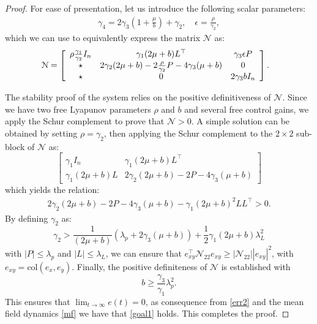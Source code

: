 \documentclass[journal,twoside]{IEEEtran}
\newcommand{\col}{ \mbox{col} }
\def\col{\mbox{col}}
\begin{document}
\begin{proof}
For ease of presentation, let us introduce the following scalar parameters: 
\begin{align}
\gamma_4=2 \gamma_3\left(1 +\frac{\mu}{b} \right) +\gamma_2, \quad \epsilon = \frac{\rho}{\gamma_2},
\end{align}
which we can use to equivalently express the matrix ${\mathcal N}$ as: 
{\small
\begin{align}
\hspace{-.3cm}
{\mathcal N}=  \left[ \begin{array}{ccc}  \rho \frac{\gamma_1}{\gamma_2} I_n &    \gamma_1 (2 \mu +b) L^\top  & \gamma_3 \epsilon P \\ \star  & 2\gamma_2 (2 \mu +b) -2\frac{\rho}{\gamma_2} P- 4\gamma_3 (\mu+b) & 0 \\
\star &   0 & 2 \gamma_3 b I_n
\end{array} \right]. 
\nonumber
\end{align}
}

The stability proof of the system relies on the positive definitiveness of ${\mathcal N}$. Since we have two free Lyapunov parameters  $\rho$ and $b$ and several free control gains,  we apply the Schur complement to prove  that ${\mathcal N}>0$.  
A simple solution can be obtained by setting $\rho= \gamma_2$, then applying the Schur complement to the $2\times 2$ sub-block of ${\mathcal N}$ as:
$$
 \left[ \begin{array}{ccc}   \gamma_1 I_n &    \gamma_1 (2 \mu +b) L^\top \\ \gamma_1 (2 \mu +b) L  & 2\gamma_2 (2 \mu +b) -2 P- 4\gamma_3 (\mu+b) 
\end{array} \right]
$$
which yields the relation: 
\begin{align}
2\gamma_2 (2 \mu +b) -2P- 4\gamma_3 (\mu+b)-\gamma_1 (2 \mu+b)^2 L L^\top >0. 
\end{align}
By defining $\gamma_2$ as:
$$
\gamma_2 > \frac{1}{(2\mu+b)} \left( \lambda_p+2\gamma_3 (\mu+b)  \right)+\frac{1}{2}\gamma_1 (2 \mu+b) \lambda_L^2 
$$
with  $ |P| \leq \lambda_p $ and  $|L| \leq \lambda_L$, we can ensure that  $e_{xy}^\top {\mathcal N}_{22} e_{xy}\geq   |{\mathcal N}_{22} |  | e_{xy}|^2$, with $e_{xy}= \col(e_x, e_y)$.  
Finally, the positive definiteness of ${\mathcal N}$ is established with 
$$
b \geq \frac{\gamma_3}{\gamma_1} \lambda_p^2.
$$  
This ensures that $\lim_{t \to \infty} e(t)=0$, as consequence from \eqref{err2} and the mean field dynamics \eqref{mf} we have that \eqref{goal1} holds.
This completes the proof.
 \end{proof}
 
\end{document}
